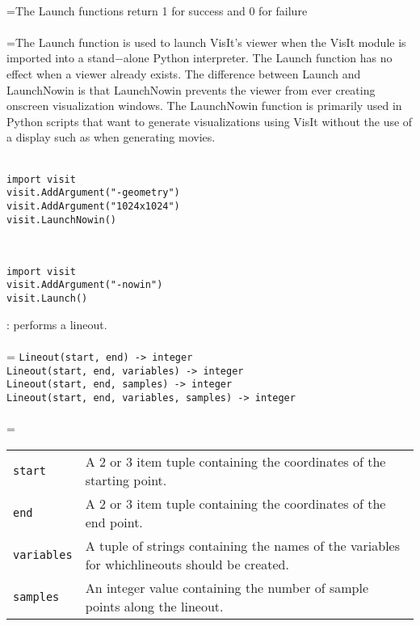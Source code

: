 \documentclass[10pt,a4paper]{report}
\begin{document}
 \\ 
\hangindent=\parindent The Launch functions return 1 for success and 0 for failure \\[-3mm] 

 \\ 
\hangindent=\parindent The Launch function is used to launch VisIt's viewer when the VisIt module is imported into a stand$-$alone Python interpreter. The Launch function has no effect when a viewer already exists. The difference between Launch and LaunchNowin is that LaunchNowin prevents the viewer from ever creating onscreen visualization windows. The LaunchNowin function is primarily used in Python scripts that want to generate visualizations using VisIt without the use of a display such as when generating movies. \\[-3mm] 

\\[-6mm]
\begin{verbatim}import visit
visit.AddArgument("-geometry")
visit.AddArgument("1024x1024")
visit.LaunchNowin()
\end{verbatim}
\\[-6mm]
\begin{verbatim}import visit
visit.AddArgument("-nowin")
visit.Launch()
\end{verbatim}
\newpage


{}
: performs a lineout.\\[-3mm]

 \\ 
\hangindent=\parindent 
\verb!Lineout(start, end) -> integer!\\ 
\verb!Lineout(start, end, variables) -> integer!\\ 
\verb!Lineout(start, end, samples) -> integer!\\ 
\verb!Lineout(start, end, variables, samples) -> integer!\\ [-3mm]

 \\ 
\hangindent=\parindent 
\begin{tabular}{lp{9cm}}
\verb!start! & A 2 or 3 item tuple containing the coordinates of the starting point. \\
\verb!end! & A 2 or 3 item tuple containing the coordinates of the end point. \\
\verb!variables! & A tuple of strings containing the names of the variables for whichlineouts should be created. \\
\verb!samples! & An integer value containing the number of sample points along the lineout. \\
\end{tabular} \\[-2mm]
\end{document}
